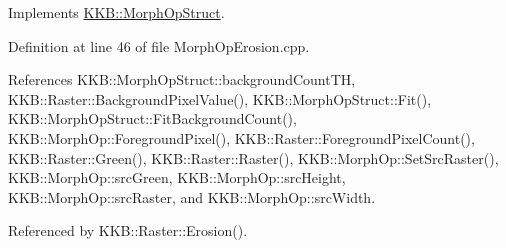 Implements \hyperlink{class_k_k_b_1_1_morph_op_struct_ace5b649ea317fcc38094e64bb5034380}{K\+K\+B\+::\+Morph\+Op\+Struct}.



Definition at line 46 of file Morph\+Op\+Erosion.\+cpp.



References K\+K\+B\+::\+Morph\+Op\+Struct\+::background\+Count\+TH, K\+K\+B\+::\+Raster\+::\+Background\+Pixel\+Value(), K\+K\+B\+::\+Morph\+Op\+Struct\+::\+Fit(), K\+K\+B\+::\+Morph\+Op\+Struct\+::\+Fit\+Background\+Count(), K\+K\+B\+::\+Morph\+Op\+::\+Foreground\+Pixel(), K\+K\+B\+::\+Raster\+::\+Foreground\+Pixel\+Count(), K\+K\+B\+::\+Raster\+::\+Green(), K\+K\+B\+::\+Raster\+::\+Raster(), K\+K\+B\+::\+Morph\+Op\+::\+Set\+Src\+Raster(), K\+K\+B\+::\+Morph\+Op\+::src\+Green, K\+K\+B\+::\+Morph\+Op\+::src\+Height, K\+K\+B\+::\+Morph\+Op\+::src\+Raster, and K\+K\+B\+::\+Morph\+Op\+::src\+Width.



Referenced by K\+K\+B\+::\+Raster\+::\+Erosion().



